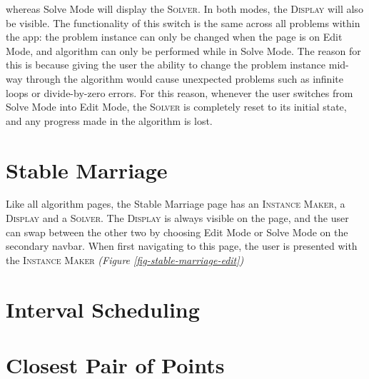 whereas Solve Mode will display the \textsc{Solver}. 
In both modes, the \textsc{Display} will also be visible. 
The functionality of this switch is the same across all problems within the app:
the problem instance can only be changed when the page is on Edit Mode, 
and algorithm can only be performed while in Solve Mode. 
The reason for this is because giving the user the ability to change the 
problem instance mid-way through the algorithm would cause unexpected problems
such as infinite loops or divide-by-zero errors. 
For this reason, whenever the user switches from Solve Mode into Edit Mode, 
the \textsc{Solver} is completely reset to its initial state, and any progress
made in the algorithm is lost.
\section{Stable Marriage}
Like all algorithm pages, the Stable Marriage page has an \textsc{Instance Maker}, 
a \textsc{Display} and a \textsc{Solver}.
The \textsc{Display} is always visible on the page, and the user can swap between 
the other two by choosing Edit Mode or Solve Mode on the secondary navbar. 
When first navigating to this page, the user is presented with the \textsc{Instance Maker}
\textit{(Figure \ref{fig-stable-marriage-edit})} 
\newline\newline

\section{Interval Scheduling}
\section{Closest Pair of Points}